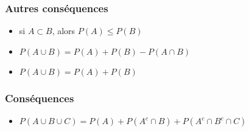 \documentclass{beamer}
\begin{document}
\begin{frame}[t]
    \frametitle{Autres conséquences}
    
    \begin{itemize}
        \item si $ A \subset B$, alors $ P(A) \leq P(B)$
        \vspace*{2cm}
    \item $P(A\cup B) = P(A) + P(B) - P(A\cap B)$
        \vspace*{2cm}
    \item $P(A \cup B) = P(A) + P(B)$
    \end{itemize}
\end{frame}
\begin{frame}[t]
    \frametitle{Conséquences}
    \begin{itemize}

        \item $P(A\cup B \cup C) = P(A) + P(A^c \cap B) + P(A^c\cap B^c \cap C)$
    \end{itemize}
\end{frame}

\end{document}
